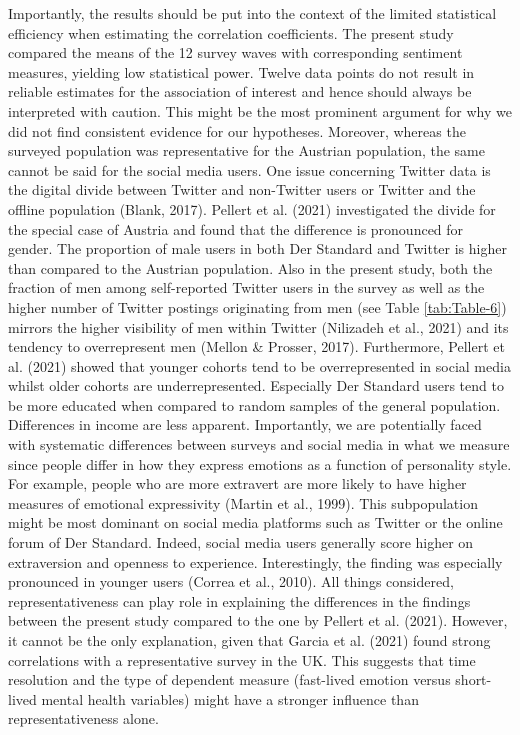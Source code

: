 \documentclass[
  english,
  jou,floatsintext]{apa7}
\begin{document}
Importantly, the results should be put into the context of the limited statistical efficiency when estimating the correlation coefficients. The present study compared the means of the 12 survey waves with corresponding sentiment measures, yielding low statistical power. Twelve data points do not result in reliable estimates for the association of interest and hence should always be interpreted with caution. This might be the most prominent argument for why we did not find consistent evidence for our hypotheses. Moreover, whereas the surveyed population was representative for the Austrian population, the same cannot be said for the social media users. One issue concerning Twitter data is the digital divide between Twitter and non-Twitter users or Twitter and the offline population (Blank, 2017). Pellert et al. (2021) investigated the divide for the special case of Austria and found that the difference is pronounced for gender. The proportion of male users in both Der Standard and Twitter is higher than compared to the Austrian population.
Also in the present study, both the fraction of men among self-reported Twitter users in the survey as well as the higher number of Twitter postings originating from men (see Table \ref{tab:Table-6}) mirrors the higher visibility of men within Twitter (Nilizadeh et al., 2021) and its tendency to overrepresent men (Mellon \& Prosser, 2017).
Furthermore, Pellert et al. (2021) showed that younger cohorts tend to be overrepresented in social media whilst older cohorts are underrepresented. Especially Der Standard users tend to be more educated when compared to random samples of the general population. Differences in income are less apparent. Importantly, we are potentially faced with systematic differences between surveys and social media in what we measure since people differ in how they express emotions as a function of personality style. For example, people who are more extravert are more likely to have higher measures of emotional expressivity (Martin et al., 1999). This subpopulation might be most dominant on social media platforms such as Twitter or the online forum of Der Standard. Indeed, social media users generally score higher on extraversion and openness to experience. Interestingly, the finding was especially pronounced in younger users (Correa et al., 2010). All things considered, representativeness can play role in explaining the differences in the findings between the present study compared to the one by Pellert et al. (2021). However, it cannot be the only explanation, given that Garcia et al. (2021) found strong correlations with a representative survey in the UK. This suggests that time resolution and the type of dependent measure (fast-lived emotion versus short-lived mental health variables) might have a stronger influence than representativeness alone.\\
\end{document}

